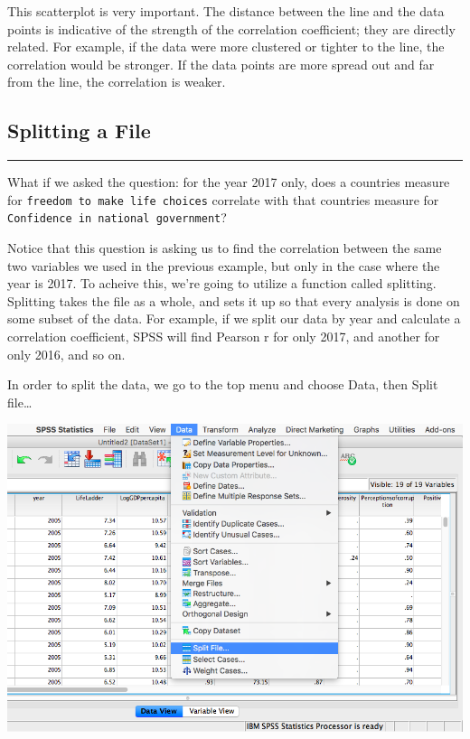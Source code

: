 \documentclass[
]{book}
\begin{document}
This scatterplot is very important. The distance between the line and the data points is indicative of the strength of the correlation coefficient; they are directly related. For example, if the data were more clustered or tighter to the line, the correlation would be stronger. If the data points are more spread out and far from the line, the correlation is weaker.

\hypertarget{splitting-a-file}{%
\subsection{Splitting a File}\label{splitting-a-file}}

\begin{center}\rule{0.5\linewidth}{0.5pt}\end{center}

What if we asked the question: for the year 2017 only, does a countries measure for \texttt{freedom\ to\ make\ life\ choices} correlate with that countries measure for \texttt{Confidence\ in\ national\ government}?

Notice that this question is asking us to find the correlation between the same two variables we used in the previous example, but only in the case where the year is 2017. To acheive this, we're going to utilize a function called splitting. Splitting takes the file as a whole, and sets it up so that every analysis is done on some subset of the data. For example, if we split our data by year and calculate a correlation coefficient, SPSS will find Pearson r for only 2017, and another for only 2016, and so on.

In order to split the data, we go to the top menu and choose {Data}, then {Split file\ldots{}}

\includegraphics{img/3.4.30.png}
\end{document}
